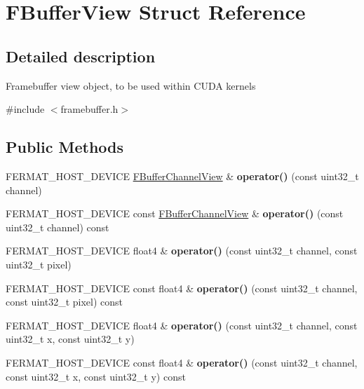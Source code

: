\hypertarget{struct_f_buffer_view}{}\section{F\+Buffer\+View Struct Reference}
\label{struct_f_buffer_view}


\subsection{Detailed description}
Framebuffer view object, to be used within C\+U\+DA kernels 

{\ttfamily \#include $<$framebuffer.\+h$>$}

\subsection*{Public Methods}
\begin{DoxyCompactItemize}
\item 
\mbox{\label{struct_f_buffer_view_a5ce76704788bf7713ce142fe1e22c93f}} 
F\+E\+R\+M\+A\+T\+\_\+\+H\+O\+S\+T\+\_\+\+D\+E\+V\+I\+CE \hyperlink{struct_f_buffer_channel_view}{F\+Buffer\+Channel\+View} \& {\bfseries operator()} (const uint32\+\_\+t channel)
\item 
\mbox{\label{struct_f_buffer_view_a3d8f2114bdd7e82c9a28a3e84834c55b}} 
F\+E\+R\+M\+A\+T\+\_\+\+H\+O\+S\+T\+\_\+\+D\+E\+V\+I\+CE const \hyperlink{struct_f_buffer_channel_view}{F\+Buffer\+Channel\+View} \& {\bfseries operator()} (const uint32\+\_\+t channel) const
\item 
\mbox{\label{struct_f_buffer_view_a26ed92f6a17ccb42e20e6d98af651bd9}} 
F\+E\+R\+M\+A\+T\+\_\+\+H\+O\+S\+T\+\_\+\+D\+E\+V\+I\+CE float4 \& {\bfseries operator()} (const uint32\+\_\+t channel, const uint32\+\_\+t pixel)
\item 
\mbox{\label{struct_f_buffer_view_ac585672daf12872994c0431519d19bad}} 
F\+E\+R\+M\+A\+T\+\_\+\+H\+O\+S\+T\+\_\+\+D\+E\+V\+I\+CE const float4 \& {\bfseries operator()} (const uint32\+\_\+t channel, const uint32\+\_\+t pixel) const
\item 
\mbox{\label{struct_f_buffer_view_af26751164dbb25f16d80f425576174bb}} 
F\+E\+R\+M\+A\+T\+\_\+\+H\+O\+S\+T\+\_\+\+D\+E\+V\+I\+CE float4 \& {\bfseries operator()} (const uint32\+\_\+t channel, const uint32\+\_\+t x, const uint32\+\_\+t y)
\item 
\mbox{\label{struct_f_buffer_view_aa1b6e4ace544aa0d567809838e27716a}} 
F\+E\+R\+M\+A\+T\+\_\+\+H\+O\+S\+T\+\_\+\+D\+E\+V\+I\+CE const float4 \& {\bfseries operator()} (const uint32\+\_\+t channel, const uint32\+\_\+t x, const uint32\+\_\+t y) const
\end{DoxyCompactItemize}
